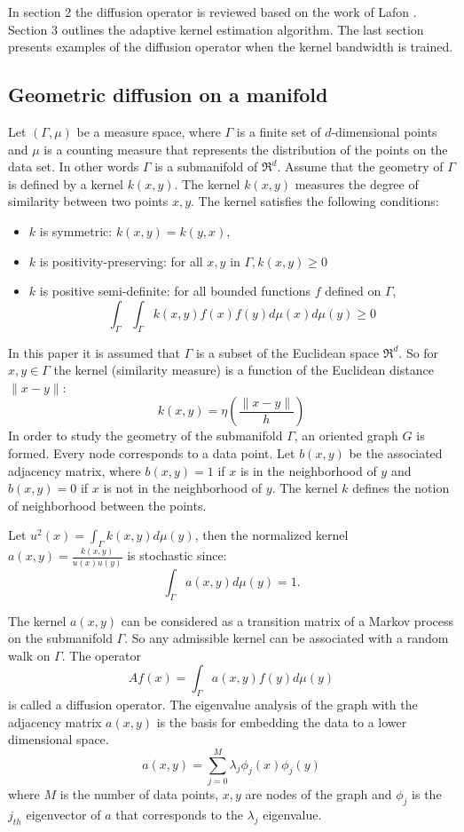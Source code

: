 \documentclass[12pt,letterpaper,doublespaced,ETD,dvips,proposal]{gtthesis}
\begin{document}
\begin{Body}
In  section 2 the diffusion operator is reviewed based on the work
of Lafon \cite{Lafon}. Section 3 outlines the adaptive kernel
estimation algorithm. The last section presents examples of the
diffusion operator when the kernel bandwidth is trained.

\subsection{Geometric diffusion on a manifold} Let  $(\Gamma,\mu)$ be
a measure space, where $\Gamma$ is a finite set of $d$-dimensional
points and $\mu$ is a counting measure that represents the
distribution of the points on the  data set. In other words $\Gamma$
is a submanifold of $\Re^{d}$. Assume that the geometry of $\Gamma$
is defined by a kernel $k(x,y)$. The kernel $k(x,y)$ measures the
degree of similarity between two points $x,y$. The kernel satisfies
the following conditions:
\begin{itemize}
    \item   $k$ is symmetric: $k(x,y)=k(y,x)$,
    \item   $k$ is positivity-preserving: for all $x,y$ in
$\Gamma, k(x,y)\geq 0$
    \item   $k$ is positive semi-definite: for all bounded
functions $f$ defined on  $\Gamma$,
\[
\int_{\Gamma} \int_{\Gamma} k(x,y)f(x)f(y)d\mu(x)d\mu(y)\geq 0\]
\end{itemize}
In this paper it is assumed that $\Gamma$ is a subset of the
Euclidean space $\Re^{d}$. So for $x,y\in\Gamma$ the kernel
(similarity measure) is a function of the Euclidean distance
$\parallel x-y\parallel:$
\[
 k(x,y)=\eta\left(\frac{\parallel x-y\parallel}{h}\right)
\]
In order to study the geometry of the submanifold $\Gamma$, an
oriented graph $G$ is formed. Every node corresponds to a data
point. Let $b(x,y)$ be the associated adjacency matrix, where
$b(x,y)=1$ if $x$ is in the neighborhood of $y$ and $b(x,y)=0$ if
$x$ is not in the neighborhood of $y$. The kernel $k$ defines the
notion of neighborhood between the points.

Let $u^2(x)=\int_{\Gamma}k(x,y)d\mu(y)$, then the normalized kernel
$a(x,y)=\frac{k(x,y)}{u(x)u(y)}$ is stochastic since:
\begin{equation}\label{kernel}
    \int_{\Gamma}a(x,y)d\mu(y)=1.
\end{equation}

The kernel $a(x,y)$ can be considered as a transition matrix of a
Markov process on the submanifold $\Gamma$. So any admissible kernel
can be associated with a random walk on $\Gamma$. The operator
\[
    Af(x)=\int_{\Gamma}a(x,y)f(y)d\mu(y)
\]
is called a diffusion operator. The eigenvalue analysis of the graph
with the adjacency matrix $a(x,y)$ is the basis for embedding the
data to a lower dimensional space.
\[
    a(x,y)=\sum_{j=0}^{M} \lambda_{j}\phi_{j}(x)\phi_{j}(y)
\]
where $M$ is the number of data points, $x,y$ are nodes of the graph
and $\phi_j$ is the $j_{th}$ eigenvector of $a$ that corresponds to
the $\lambda_j$ eigenvalue.



\end{Body}
\end{document}
